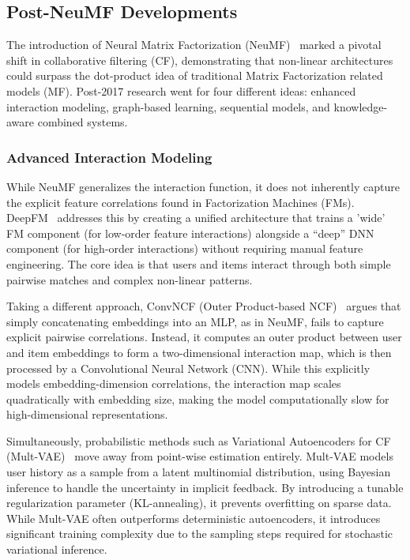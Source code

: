 \documentclass[11pt]{article}
\begin{document}
\subsection{Post-NeuMF Developments}
\label{sec:post-neumf}
The introduction of Neural Matrix Factorization (NeuMF)~\cite{he2017neural} marked a pivotal shift in collaborative filtering (CF), demonstrating that non-linear architectures could surpass the dot-product idea of traditional Matrix Factorization related models (MF). Post-2017 research went for four different ideas: enhanced interaction modeling, graph-based learning, sequential models, and knowledge-aware combined systems.

\subsubsection{Advanced Interaction Modeling}

While NeuMF generalizes the interaction function, it does not inherently capture the explicit feature correlations found in Factorization Machines (FMs). DeepFM~\cite{guo2017deepfm} addresses this by creating a unified architecture that trains a 'wide' FM component (for low-order feature interactions) alongside a ``deep'' DNN component (for high-order interactions) without requiring manual feature engineering. The core idea is that users and items interact through both simple pairwise matches and complex non-linear patterns. 

Taking a different approach, ConvNCF (Outer Product-based NCF)~\cite{du2018convncf} argues that simply concatenating embeddings into an MLP, as in NeuMF, fails to capture explicit pairwise correlations. Instead, it computes an outer product between user and item embeddings to form a two-dimensional interaction map, which is then processed by a Convolutional Neural Network (CNN). While this explicitly models embedding-dimension correlations, the interaction map scales quadratically with embedding size, making the model computationally slow for high-dimensional representations.

Simultaneously, probabilistic methods such as Variational Autoencoders for CF (Mult-VAE)~\cite{liang2018variational} move away from point-wise estimation entirely. Mult-VAE models user history as a sample from a latent multinomial distribution, using Bayesian inference to handle the uncertainty in implicit feedback. By introducing a tunable regularization parameter (KL-annealing), it prevents overfitting on sparse data. While Mult-VAE often outperforms deterministic autoencoders, it introduces significant training complexity due to the sampling steps required for stochastic variational inference.
\end{document}
